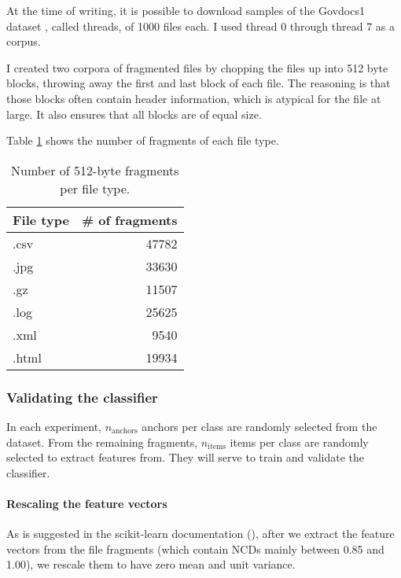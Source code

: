 At the time of writing, it is possible to download samples of the Govdocs1
dataset \cite{Garfinkel2009}, called threads, of 1000 files each. I used
thread 0 through thread 7 as a corpus.

I created two corpora of fragmented files by chopping the files up into 512 byte blocks, throwing away the first and last block of each file. The
     reasoning is that those blocks often contain header information, which is
     atypical for the file at large. It also ensures that all blocks are of
     equal size.

Table \ref{table:number_of_fragments} shows the number of fragments of each file type.

\begin{table}
\begin{tabular}{lr}
\hline
 File type   &   \# of fragments \\
\hline
 .csv        &                 47782 \\
 .jpg        &                 33630 \\
 .gz         &                 11507 \\
 .log        &                 25625 \\
 .xml        &                 9540  \\
 .html       &                 19934  \\
\hline
\end{tabular}
\caption{Number of 512-byte fragments per file type.}
\label{table:number_of_fragments}
\end{table}


\subsubsection{Validating the classifier}

In each experiment, $n_{\text{anchors}}$ anchors per class are randomly selected from
the dataset. From the remaining fragments, $n_{\text{items}}$ items per
class are randomly selected to extract features from. They will serve to
train and validate the classifier.

\paragraph{Rescaling the feature vectors} As is suggested in the
scikit-learn documentation (\cite{Pedregosa2011}), after we extract the
feature vectors from the file fragments (which contain NCDs mainly between
0.85 and 1.00), we rescale them to have zero mean and unit variance.

